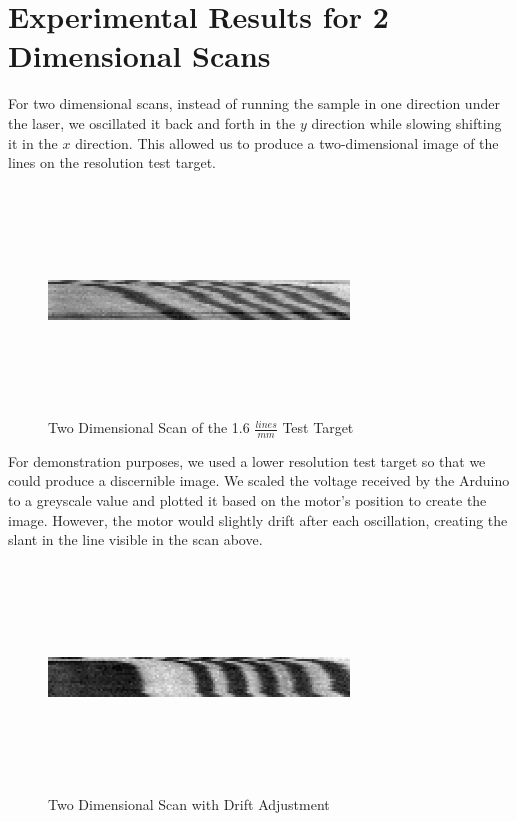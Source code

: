 \documentclass[letterpaper, 12pt]{article}
\begin{document}
\section{Experimental Results for 2 Dimensional Scans}
\par
For two dimensional scans, instead of running the sample in one direction under the laser, we oscillated it back and forth in the $y$ direction while slowing shifting it in the $x$ direction. This allowed us to produce a two-dimensional image of the lines on the resolution test target.

\begin{figure}[H]
  \centering
  \includegraphics[width=8cm,height=6cm]{2d_scan_1}
  \caption[caption]{Two Dimensional Scan of the 1.6 $\frac{lines}{mm}$ Test Target}
\end{figure}

\par
For demonstration purposes, we used a lower resolution test target so that we could produce a discernible image. We scaled the voltage received by the Arduino to a greyscale value and plotted it based on the motor's position to create the image. However, the motor would slightly drift after each oscillation, creating the slant in the line visible in the scan above.

\begin{figure}[H]
  \centering
  \includegraphics[width=8cm,height=6cm]{2d_scan_2}
  \caption[caption]{Two Dimensional Scan with Drift Adjustment}
\end{figure}
\end{document}
